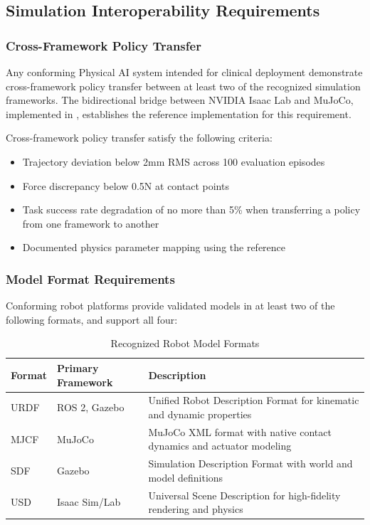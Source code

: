 \documentclass[11pt,letterpaper]{article}
\begin{document}
\subsection{Simulation Interoperability Requirements}

\subsubsection{Cross-Framework Policy Transfer}

Any conforming Physical AI system intended for clinical deployment \SHALL{} demonstrate cross-framework policy transfer between at least two of the recognized simulation frameworks. The bidirectional bridge between NVIDIA Isaac Lab and MuJoCo, implemented in , establishes the reference implementation for this requirement.

Cross-framework policy transfer \SHALL{} satisfy the following criteria:
\begin{itemize}
  \item Trajectory deviation below 2mm RMS across 100 evaluation episodes
  \item Force discrepancy below 0.5N at contact points
  \item Task success rate degradation of no more than 5\% when transferring a policy from one framework to another
  \item Documented physics parameter mapping using the  reference
\end{itemize}

\subsubsection{Model Format Requirements}

Conforming robot platforms \SHALL{} provide validated models in at least two of the following formats, and \SHOULD{} support all four:

\begin{table}[H]
\centering
\caption{Recognized Robot Model Formats}
\small
\begin{tabularx}{\textwidth}{l l X}
\toprule
\textbf{Format} & \textbf{Primary Framework} & \textbf{Description} \\
\midrule
URDF & ROS 2, Gazebo & Unified Robot Description Format for kinematic and dynamic properties \\
MJCF & MuJoCo & MuJoCo XML format with native contact dynamics and actuator modeling \\
SDF & Gazebo & Simulation Description Format with world and model definitions \\
USD & Isaac Sim/Lab & Universal Scene Description for high-fidelity rendering and physics \\
\bottomrule
\end{tabularx}
\end{table}
\end{document}
